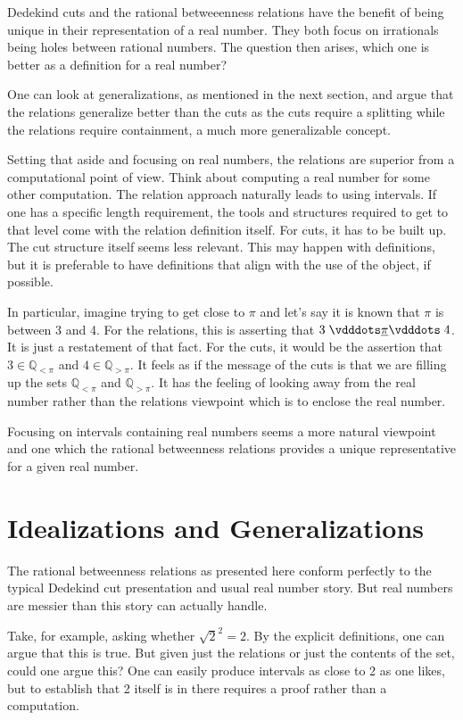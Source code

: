 \documentclass[12pt]{article}
\newcommand{\qcut}[2][x]{\ensuremath{\mathbb{Q}_{#2 #1}}}
\newcommand{\qlt}[1][x]{\qcut[#1]{<}}
\newcommand{\qgt}[1][x]{\qcut[#1]{>}}
\begin{document}
Dedekind cuts and the rational betweeenness relations have the benefit of being unique in their representation of a real number. They both focus on irrationals being holes between rational numbers. The question then arises, which one is better as a definition for a real number? 

One can look at generalizations, as mentioned in the next section, and argue that the relations generalize better than the cuts as the cuts require a splitting while the relations require containment, a much more generalizable concept. 

Setting that aside and focusing on real numbers, the relations are superior from a computational point of view. Think about computing a real number for some other computation. The relation approach naturally leads to using intervals. If one has a specific length requirement, the tools and structures required to get to that level come with the relation definition itself. For cuts, it has to be built up. The cut structure itself seems less relevant. This may happen with definitions, but it is preferable to have definitions that align with the use of the object, if possible. 

In particular, imagine trying to get close to $\pi$ and let's say it is known that $\pi$ is between 3 and 4. For the relations, this is asserting that $3 \xrel[\pi] 4$. It is just a restatement of that fact. For the cuts, it would be the assertion that $3 \in \qlt[\pi]$ and $4 \in \qgt[\pi]$. It feels as if the message of the cuts is that we are filling up the sets $\qlt[\pi]$ and $\qgt[\pi]$. It has the feeling of looking away from the real number rather than the relations viewpoint which is to enclose the real number. 

Focusing on intervals containing real numbers seems a more natural viewpoint and one which the rational betweenness relations provides a unique representative for a given real number. 


\section{Idealizations and Generalizations}

The rational betweenness relations as presented here conform perfectly to the typical Dedekind cut presentation and usual real number story. But real numbers are messier than this story can actually handle. 

Take, for example, asking whether $\sqrt{2}^2 = 2$. By the explicit definitions, one can argue that this is true. But given just the relations or just the contents of the set, could one argue this? One can easily produce intervals as close to 2 as one likes, but to establish that 2 itself is in there requires a proof rather than a computation. 
\end{document}
